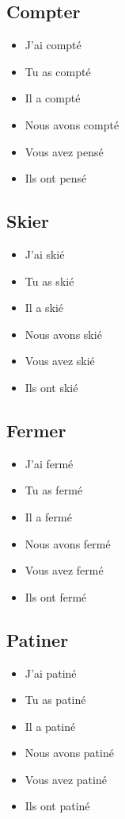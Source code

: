 \subsection{Compter}

\begin{itemize}
    \item J'ai compté 
    \item Tu as compté 
    \item Il a compté 
    \item Nous avons compté 
    \item Vous avez pensé 
    \item Ils ont pensé
\end{itemize}

\subsection{Skier}

\begin{itemize}
    \item J'ai skié 
    \item Tu as skié 
    \item Il a skié 
    \item Nous avons skié 
    \item Vous avez skié
    \item Ils ont skié 
\end{itemize}

\subsection{Fermer}

\begin{itemize}
    \item J'ai fermé 
    \item Tu as fermé 
    \item Il a fermé 
    \item Nous avons fermé 
    \item Vous avez fermé
    \item Ils ont fermé
\end{itemize}

\subsection{Patiner}

\begin{itemize}
    \item J'ai patiné 
    \item Tu as patiné 
    \item Il a patiné 
    \item Nous avons patiné 
    \item Vous avez patiné 
    \item Ils ont patiné
\end{itemize}

